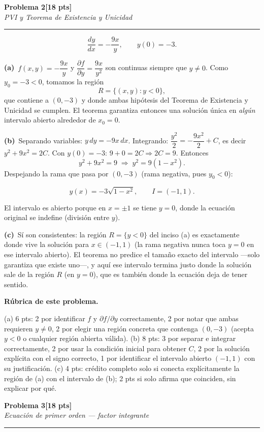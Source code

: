 \documentclass[11pt,letterpaper]{article}
\newcommand{\problema}[3]{%
  \bigskip\bigskip\noindent
  {\Large\textbf{Problema #1}}\hfill\textbf{[#2 pts]}\\[3pt]
  {\small\itshape #3}\par
  \vspace{2pt}\hrule\vspace{8pt}
}
\newcommand{\subparte}[2]{%
  \medskip\noindent\textbf{(#1}\ #2\par\smallskip
}
\newenvironment{resultado}
  {\begin{mdframed}[linecolor=black,linewidth=0.6pt,
    innerleftmargin=6pt,innerrightmargin=6pt,innertopmargin=4pt,innerbottommargin=4pt]
   \bfseries}
  {\end{mdframed}}
\newenvironment{rubrica}{%
  \begin{mdframed}[linecolor=black,linewidth=0.6pt,
    innerleftmargin=8pt,innerrightmargin=8pt,innertopmargin=5pt,innerbottommargin=5pt]
  \small\textbf{Rúbrica de este problema.}\par\smallskip
}{\end{mdframed}}
\begin{document}
\newpage
\problema{2}{18}{PVI y Teorema de Existencia y Unicidad}

\[
\frac{dy}{dx} = -\frac{9x}{y}, \qquad y(0)=-3.
\]

\subparte{a)}{$f(x,y) = -\dfrac{9x}{y}$ y $\dfrac{\partial f}{\partial y} = \dfrac{9x}{y^2}$ son continuas siempre que $y \neq 0$. Como $y_0 = -3 < 0$, tomamos la región
\[
R = \{(x,y) : y < 0\},
\]
que contiene a $(0,-3)$ y donde ambas hipótesis del Teorema de Existencia y Unicidad se cumplen. El teorema garantiza entonces una solución única en \emph{algún} intervalo abierto alrededor de $x_0=0$.}

\subparte{b)}{Separando variables: $y\,dy = -9x\,dx$. Integrando: $\dfrac{y^2}{2} = -\dfrac{9x^2}{2} + C$, es decir $y^2 + 9x^2 = 2C$. Con $y(0)=-3$: $9 + 0 = 2C \Rightarrow 2C = 9$. Entonces
\[
y^2 + 9x^2 = 9 \;\Longrightarrow\; y^2 = 9(1-x^2).
\]
Despejando la rama que pasa por $(0,-3)$ (rama negativa, pues $y_0<0$):
\begin{resultado}
\[
y(x) = -3\sqrt{1-x^2}, \qquad I = (-1,1).
\]
\end{resultado}
El intervalo es abierto porque en $x=\pm 1$ se tiene $y=0$, donde la ecuación original se indefine (división entre $y$).}

\subparte{c)}{Sí son consistentes: la región $R=\{y<0\}$ del inciso (a) es exactamente donde vive la solución para $x\in(-1,1)$ (la rama negativa nunca toca $y=0$ en ese intervalo abierto). El teorema no predice el tamaño exacto del intervalo —solo garantiza que existe uno—, y aquí ese intervalo termina justo donde la solución sale de la región $R$ (en $y=0$), que es también donde la ecuación deja de tener sentido.}

\begin{rubrica}
(a) 6 pts: 2 por identificar $f$ y $\partial f/\partial y$ correctamente, 2 por notar que ambas requieren $y\neq0$, 2 por elegir una región concreta que contenga $(0,-3)$ (acepta $y<0$ o cualquier región abierta válida). (b) 8 pts: 3 por separar e integrar correctamente, 2 por usar la condición inicial para obtener $C$, 2 por la solución explícita con el signo correcto, 1 por identificar el intervalo abierto $(-1,1)$ con su justificación. (c) 4 pts: crédito completo solo si conecta explícitamente la región de (a) con el intervalo de (b); 2 pts si solo afirma que coinciden, sin explicar por qué.
\end{rubrica}

\problema{3}{18}{Ecuación de primer orden — factor integrante}
\end{document}
